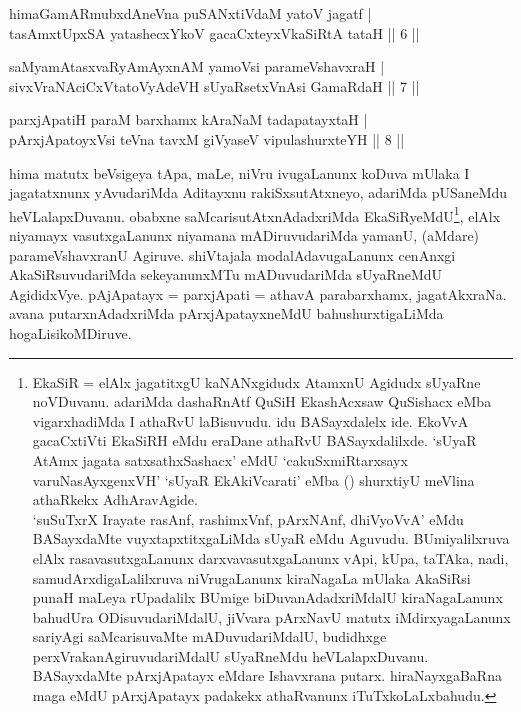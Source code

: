 
\begin{shl}
himaGamARmubxdAneVna puSANxtiVdaM yatoV jagatf | \\
tasAmxtUpxSA yatashecxYkoV gacaCxteyxVkaSiRtA tataH \hfill||  6 || 
\end{shl}

\begin{shl}
saMyamAtasxvaRyAmAyxnAM yamoV\s si parameVshavxraH | \\
sivxVraNAciCxVtatoVyAdeVH sUyaRsetxVnAsi GamaRdaH \hfill||  7 ||
\end{shl}

\begin{shl}
parxjApatiH paraM barxhamx kAraNaM tadapatayxtaH | \\
pArxjApatoyxV\s si teVna tavxM giVyaseV vipulashurxteYH \hfill||  8 || 
\end{shl}

\begin{artha} 
hima matutx beVsigeya tApa, maLe, niVru ivugaLanunx koDuva mUlaka I 
jagatatxnunx yAvudariMda Aditayxnu rakiSxsutAtxneyo, adariMda 
pUSaneMdu heVLalapxDuvanu. obabxne saMcarisutAtxnAdadxriMda 
EkaSiRyeMdU\footnote{EkaSiR = elAlx jagatitxgU kaNANxgidudx AtamxnU 
Agidudx sUyaRne noVDuvanu. adariMda dashaRnAtf QuSiH EkashAcxsaw 
QuSishacx eMba vigarxhadiMda I athaRvU laBisuvudu. idu BASayxdalelx 
ide. EkoVvA gacaCxtiVti EkaSiRH eMdu eraDane athaRvU BASayxdalilxde. 
`sUyaR AtAmx jagata satxsathxSashacx' eMdU `cakuSxmiRtarxsayx 
varuNasAyxgenxVH' `sUyaR EkAkiVcarati' eMba () shurxtiyU meVlina 
athaRkekx AdhAravAgide.\\ 
`suSuTxrX Irayate rasAnf, rashimxVnf, pArxNAnf, dhiVyoVvA' eMdu BASayxdaMte vuyxtapxtitxgaLiMda sUyaR eMdu Aguvudu. 
BUmiyalilxruva elAlx rasavasutxgaLanunx darxvavasutxgaLanunx vApi, 
kUpa, taTAka, nadi, samudArxdigaLalilxruva niVrugaLanunx kiraNagaLa 
mUlaka AkaSiRsi punaH maLeya rUpadalilx BUmige biDuvanAdadxriMdalU 
kiraNagaLanunx bahudUra ODisuvudariMdalU, jiVvara pArxNavU matutx 
iMdirxyagaLanunx sariyAgi saMcarisuvaMte mADuvudariMdalU, budidhxge 
perxVrakanAgiruvudariMdalU sUyaRneMdu heVLalapxDuvanu. BASayxdaMte 
pArxjApatayx eMdare Ishavxrana putarx. hiraNayxgaBaRna maga eMdU 
pArxjApatayx padakekx athaRvanunx iTuTxkoLaLxbahudu.}, 
elAlx niyamayx vasutxgaLanunx niyamana 
mADiruvudariMda yamanU, (aMdare) parameVshavxranU Agiruve. shiVtajala 
modalAdavugaLanunx cenAnxgi AkaSiRsuvudariMda sekeyanunxMTu 
mADuvudariMda sUyaRneMdU AgididxVye. pAjApatayx = parxjApati = athavA 
parabarxhamx, jagatAkxraNa. avana putarxnAdadxriMda pArxjApatayxneMdU 
bahushurxtigaLiMda hogaLisikoMDiruve.
\end{artha}

